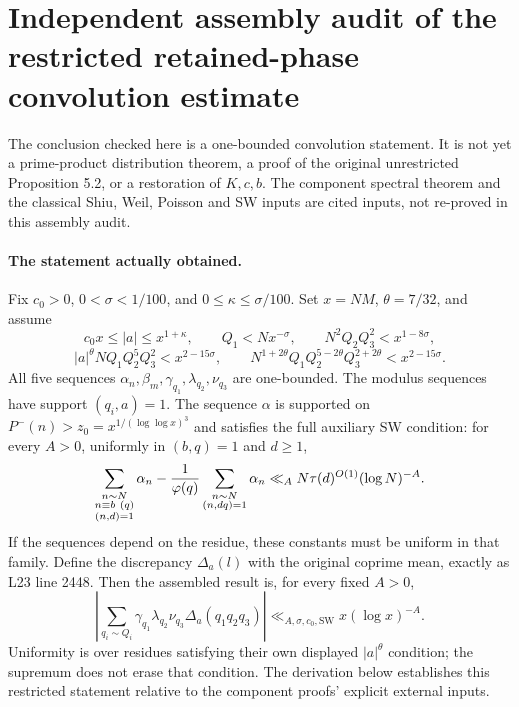 \section*{Independent assembly audit of the restricted retained-phase convolution estimate}
\label{sec:restricted-prop52-composite-20261009}

The conclusion checked here is a one-bounded convolution statement.
It is not yet a prime-product distribution theorem, a proof of the
original unrestricted Proposition 5.2, or a restoration of $K,c,b$.
The component spectral theorem and the classical Shiu, Weil, Poisson
and SW inputs are cited inputs, not re-proved in this assembly audit.

\paragraph{The statement actually obtained.}
Fix $c_0>0$, $0<\sigma<1/100$, and
$0\leq\kappa\leq\sigma/100$.  Set $x=NM$, $\theta=7/32$, and assume
\[
 c_0x\leq |a|\leq x^{1+\kappa},\qquad
 Q_1<Nx^{-\sigma},\qquad N^2Q_2Q_3^2<x^{1-8\sigma},
\]
\[
 |a|^\theta NQ_1Q_2^5Q_3^2<x^{2-15\sigma},\qquad
 N^{1+2\theta}Q_1Q_2^{5-2\theta}Q_3^{2+2\theta}<x^{2-15\sigma}.
\]
All five sequences $\alpha_n,\beta_m,\gamma_{q_1},\lambda_{q_2},
\nu_{q_3}$ are one-bounded.  The modulus sequences have support
$(q_i,a)=1$.  The sequence $\alpha$ is supported on
$P^-(n)>z_0=x^{1/(\log\log x)^3}$ and satisfies the full auxiliary
SW condition: for every $A>0$, uniformly in $(b,q)=1$ and $d\geq1$,
\[
 \sum_{\substack{n\sim N\\n\equiv b\ (q)\\(n,d)=1}}\alpha_n
 -{1\over\varphi(q)}\sum_{\substack{n\sim N\\(n,dq)=1}}\alpha_n
 \ll_A N\tau(d)^{O(1)}(\log N)^{-A}.
\]
If the sequences depend on the residue, these constants must be
uniform in that family.  Define the discrepancy $\Delta_a(l)$ with
the original coprime mean, exactly as L23 line 2448.  Then the assembled
result is, for every fixed $A>0$,
\begin{equation}\label{eq:restricted-composite-conclusion}
 \left|\sum_{q_i\sim Q_i}\gamma_{q_1}\lambda_{q_2}\nu_{q_3}
                 \Delta_a(q_1q_2q_3)\right|
 \ll_{A,\sigma,c_0,\mathrm{SW}} x(\log x)^{-A}.
\end{equation}
Uniformity is over residues satisfying their own displayed
$|a|^\theta$ condition; the supremum does not erase that condition.
The derivation below establishes this restricted statement relative
to the component proofs' explicit external inputs.

